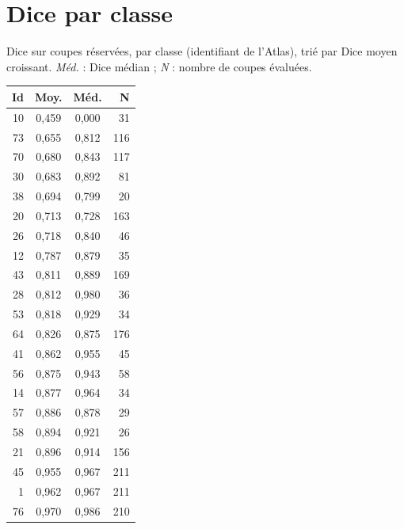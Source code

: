 \documentclass[12pt,a4paper]{report}
\begin{document}
\appendix
\chapter{Dice par classe}

Dice sur coupes réservées, par classe (identifiant de l'Atlas), trié par Dice moyen croissant. \textit{Méd.} : Dice médian ; \textit{N} : nombre de coupes évaluées.

\begingroup\footnotesize\setlength{\tabcolsep}{3pt}
\noindent
\begin{minipage}[t]{0.48\textwidth}
\centering
\begin{tabular}{rccr}
\toprule
\textbf{Id} & \textbf{Moy.} & \textbf{Méd.} & \textbf{N} \\
\midrule
10 & 0,459 & 0,000 & 31 \\
73 & 0,655 & 0,812 & 116 \\
70 & 0,680 & 0,843 & 117 \\
30 & 0,683 & 0,892 & 81 \\
38 & 0,694 & 0,799 & 20 \\
20 & 0,713 & 0,728 & 163 \\
26 & 0,718 & 0,840 & 46 \\
12 & 0,787 & 0,879 & 35 \\
43 & 0,811 & 0,889 & 169 \\
28 & 0,812 & 0,980 & 36 \\
53 & 0,818 & 0,929 & 34 \\
64 & 0,826 & 0,875 & 176 \\
41 & 0,862 & 0,955 & 45 \\
56 & 0,875 & 0,943 & 58 \\
14 & 0,877 & 0,964 & 34 \\
57 & 0,886 & 0,878 & 29 \\
58 & 0,894 & 0,921 & 26 \\
21 & 0,896 & 0,914 & 156 \\
45 & 0,955 & 0,967 & 211 \\
1 & 0,962 & 0,967 & 211 \\
76 & 0,970 & 0,986 & 210 \\
\bottomrule
\end{tabular}
\end{minipage}\hfill
\end{document}
